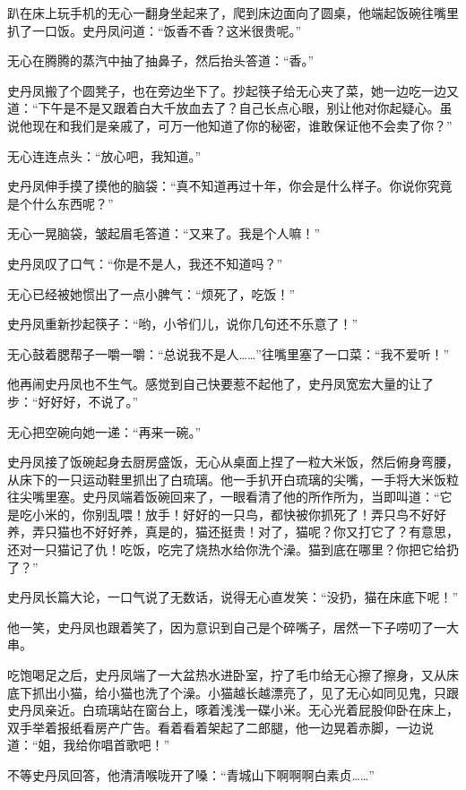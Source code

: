 趴在床上玩手机的无心一翻身坐起来了，爬到床边面向了圆桌，他端起饭碗往嘴里扒了一口饭。史丹凤问道：``饭香不香？这米很贵呢。''

无心在腾腾的蒸汽中抽了抽鼻子，然后抬头答道：``香。''

史丹凤搬了个圆凳子，也在旁边坐下了。抄起筷子给无心夹了菜，她一边吃一边又道：``下午是不是又跟着白大千放血去了？自己长点心眼，别让他对你起疑心。虽说他现在和我们是亲戚了，可万一他知道了你的秘密，谁敢保证他不会卖了你？''

无心连连点头：``放心吧，我知道。''

史丹凤伸手摸了摸他的脑袋：``真不知道再过十年，你会是什么样子。你说你究竟是个什么东西呢？''

无心一晃脑袋，皱起眉毛答道：``又来了。我是个人嘛！''

史丹凤叹了口气：``你是不是人，我还不知道吗？''

无心已经被她惯出了一点小脾气：``烦死了，吃饭！''

史丹凤重新抄起筷子：``哟，小爷们儿，说你几句还不乐意了！''

无心鼓着腮帮子一嚼一嚼：``总说我不是人\ldots{}\ldots{}''往嘴里塞了一口菜：``我不爱听！''

他再闹史丹凤也不生气。感觉到自己快要惹不起他了，史丹凤宽宏大量的让了步：``好好好，不说了。''

无心把空碗向她一递：``再来一碗。''

史丹凤接了饭碗起身去厨房盛饭，无心从桌面上捏了一粒大米饭，然后俯身弯腰，从床下的一只运动鞋里抓出了白琉璃。他一手扒开白琉璃的尖嘴，一手将大米饭粒往尖嘴里塞。史丹凤端着饭碗回来了，一眼看清了他的所作所为，当即叫道：``它是吃小米的，你别乱喂！放手！好好的一只鸟，都快被你抓死了！弄只鸟不好好养，弄只猫也不好好养，真是的，猫还挺贵！对了，猫呢？你又打它了？有意思，还对一只猫记了仇！吃饭，吃完了烧热水给你洗个澡。猫到底在哪里？你把它给扔了？''

史丹凤长篇大论，一口气说了无数话，说得无心直发笑：``没扔，猫在床底下呢！''

他一笑，史丹凤也跟着笑了，因为意识到自己是个碎嘴子，居然一下子唠叨了一大串。

吃饱喝足之后，史丹凤端了一大盆热水进卧室，拧了毛巾给无心擦了擦身，又从床底下抓出小猫，给小猫也洗了个澡。小猫越长越漂亮了，见了无心如同见鬼，只跟史丹凤亲近。白琉璃站在窗台上，啄着浅浅一碟小米。无心光着屁股仰卧在床上，双手举着报纸看房产广告。看着看着架起了二郎腿，他一边晃着赤脚，一边说道：``姐，我给你唱首歌吧！''

不等史丹凤回答，他清清喉咙开了嗓：``青城山下啊啊啊白素贞\ldots{}\ldots{}''

